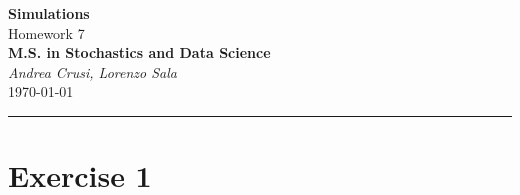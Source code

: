 \documentclass[12pt]{article}
\begin{document}
	\textcolor{UM_Brown}{
		\begin{center}
			\textbf{\Large Simulations}\\
			\vspace{5pt}
			Homework 7 \\
			\vspace{5pt}
			\textbf{M.S. in Stochastics and Data Science}\\
			\vspace{20pt}
			\textit{Andrea Crusi, Lorenzo Sala} \\
			\vspace{5pt}
			\today
		\end{center}
		\vspace{10pt}
		\hrule
	}
	
	
	
	
	\section{Exercise 1}
\end{document}
